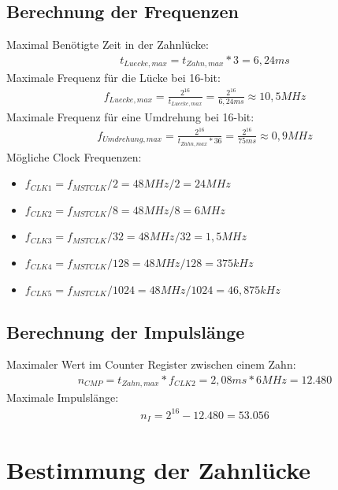 \documentclass[12pt]{article}
\begin{document}
\subsection{Berechnung der Frequenzen}

Maximal Benötigte Zeit in der Zahnlücke:
\begin{gather}
    t_{Luecke,max} = t_{Zahn,max} * 3 = 6,24ms
\end{gather}
Maximale Frequenz für die Lücke bei 16-bit:
\begin{gather}
    f_{Luecke, max} = \frac{2^{16}}{t_{Luecke,max}} = \frac{2^{16}}{6,24ms} \approx 10,5 MHz
\end{gather}
Maximale Frequenz für eine Umdrehung bei 16-bit:
\begin{gather}
    f_{Umdrehung,max} = \frac{2^{16}}{t_{Zahn,max} * 36} = \frac{2^{16}}{75ms} \approx 0,9MHz
\end{gather}
Mögliche Clock Frequenzen:
\begin{itemize}
    \item $f_{CLK1} = f_{MSTCLK} / 2 = 48MHz / 2 = 24MHz$ \\
    \item $f_{CLK2} = f_{MSTCLK} / 8 = 48MHz / 8 = 6MHz$ \\
    \item $f_{CLK3} = f_{MSTCLK} / 32 = 48MHz / 32 = 1,5MHz$ \\
    \item $f_{CLK4} = f_{MSTCLK} / 128 = 48MHz / 128 = 375kHz$ \\
    \item $f_{CLK5} = f_{MSTCLK} / 1024 = 48MHz / 1024 = 46,875kHz$ \\
\end{itemize}

\subsection{Berechnung der Impulslänge}
Maximaler Wert im Counter Register zwischen einem Zahn:
\begin{gather}
    n_{CMP} = t_{Zahn,max} * f_{CLK2} = 2,08ms * 6MHz = 12.480
\end{gather}
Maximale Impulslänge:
\begin{gather}
    n_{I} = 2^{16} - 12.480 = 53.056
\end{gather}


\section{Bestimmung der Zahnlücke}
\end{document}
